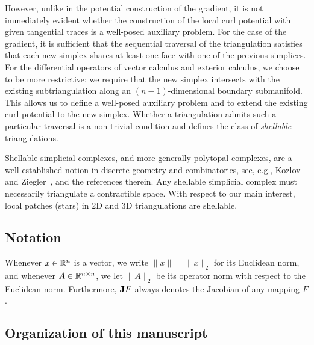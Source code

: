 \documentclass[10pt,a4paper]{article}
\begin{document}

However, unlike in the potential construction of the gradient, it is not immediately evident whether the construction of the local curl potential with given tangential traces is a well-posed auxiliary problem. 
For the case of the gradient, it is sufficient that the sequential traversal of the triangulation satisfies that each new simplex shares at least one face with one of the previous simplices. 
For the differential operators of vector calculus and exterior calculus, we choose to be more restrictive: 
we require that the new simplex intersects with the existing subtriangulation along an $(n-1)$-dimensional boundary submanifold.
This allows us to define a well-posed auxiliary problem and to extend the existing curl potential to the new simplex. 
Whether a triangulation admits such a particular traversal is a non-trivial condition and defines the class of \emph{shellable} triangulations.

 
 
 
 
Shellable simplicial complexes, and more generally polytopal complexes, are a well-established notion in discrete geometry and combinatorics, see, e.g., Kozlov~\cite{kozlov2008combinatorial} and Ziegler~\cite{ziegler1995lectures}, and the references therein.
Any shellable simplicial complex must necessarily triangulate a contractible space. 
With respect to our main interest, local patches (stars) in 2D and 3D triangulations are shellable. 

















\subsection{Notation}

Whenever $x \in {\mathbb R}^{n}$ is a vector, we write $\|x\| = \|x\|_{2}$ for its Euclidean norm, 
and whenever $A \in {\mathbb R}^{n \times n}$, we let $\| A \|_{2}$ be its operator norm with respect to the Euclidean norm. 
Furthermore, ${\mathbf{J}} F$ always denotes the Jacobian of any mapping $F$. 




\subsection{Organization of this manuscript}
\end{document}
